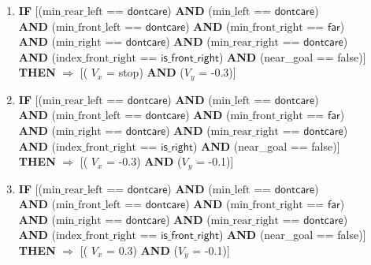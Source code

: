 \begin{enumerate}
	\item \textbf{IF} [($\text{min\_rear\_left}$ == $\textsf{dontcare}$) 
	\textbf{AND} ($\text{min\_left}$ == $\textsf{dontcare}$)\\
	\textbf{AND} ($\text{min\_front\_left}$ == $\textsf{dontcare}$)
	\textbf{AND} ($\text{min\_front\_right}$ == $\textsf{far}$)\\
	\textbf{AND} ($\text{min\_right}$ == $\textsf{dontcare}$) 
	\textbf{AND} ($\text{min\_rear\_right}$ == $\textsf{dontcare}$) \\
	\textbf{AND} ($\text{index\_front\_right}$ == $\textsf{is\_front\_right}$)
	\textbf{AND} (near\_goal == \textsf{false})]\\
	\textbf{THEN} $\Rightarrow$ [( $V_x$ = \textsf{stop}) \textbf{AND} ($V_y$ = \textsf{-0.3})]

	\item \textbf{IF} [($\text{min\_rear\_left}$ == $\textsf{dontcare}$) 
	\textbf{AND} ($\text{min\_left}$ == $\textsf{dontcare}$)\\
	\textbf{AND} ($\text{min\_front\_left}$ == $\textsf{dontcare}$)
	\textbf{AND} ($\text{min\_front\_right}$ == $\textsf{far}$)\\
	\textbf{AND} ($\text{min\_right}$ == $\textsf{dontcare}$) 
	\textbf{AND} ($\text{min\_rear\_right}$ == $\textsf{dontcare}$) \\
	\textbf{AND} ($\text{index\_front\_right}$ == $\textsf{is\_right}$)
	\textbf{AND} (near\_goal == \textsf{false})]\\
	\textbf{THEN} $\Rightarrow$ [( $V_x$ = \textsf{-0.3}) \textbf{AND} ($V_y$ = \textsf{-0.1})]
	
	\item \textbf{IF} [($\text{min\_rear\_left}$ == $\textsf{dontcare}$) 
	\textbf{AND} ($\text{min\_left}$ == $\textsf{dontcare}$)\\
	\textbf{AND} ($\text{min\_front\_left}$ == $\textsf{dontcare}$)
	\textbf{AND} ($\text{min\_front\_right}$ == $\textsf{far}$)\\
	\textbf{AND} ($\text{min\_right}$ == $\textsf{dontcare}$) 
	\textbf{AND} ($\text{min\_rear\_right}$ == $\textsf{dontcare}$) \\
	\textbf{AND} ($\text{index\_front\_right}$ == $\textsf{is\_front\_right}$)
	\textbf{AND} (near\_goal == \textsf{false})]\\
	\textbf{THEN} $\Rightarrow$ [( $V_x$ = \textsf{0.3}) \textbf{AND} ($V_y$ = \textsf{-0.1})]	
	

\end{enumerate}
